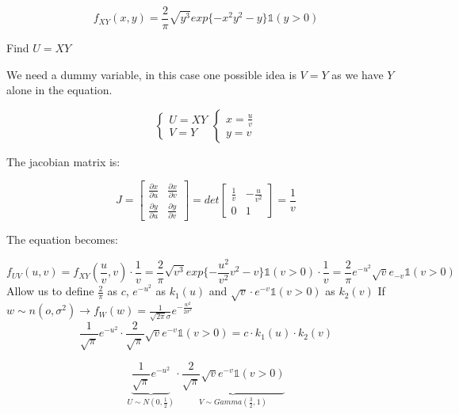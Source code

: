\[
f_{XY} (x,y) = \frac{2}{\pi} \sqrt{y^3} exp\{ -x^2y^2 -y\} \mathbb{1}(y>0)
\]

Find \(U=XY\)


We need a dummy variable, in this case one possible idea is \(V=Y\) as we have \(Y\) alone in the equation.

\[
\begin{cases}
    U = XY \\
    V = Y
\end{cases} \begin{cases}
    x = \frac{u}{v} \\
    y = v
\end{cases}
\]

The jacobian matrix is:

\[
J = \begin{bmatrix}
\frac{{\partial x}}{{\partial u}} & \frac{{\partial x}}{{\partial v}} \\
\frac{{\partial y}}{{\partial u}} & \frac{{\partial y}}{{\partial v}}
\end{bmatrix} =d et \begin{bmatrix}
\frac{1}{v} & -\frac{u}{v^2} \\
0 & 1
\end{bmatrix} = \frac{1}{v}
\]

The equation becomes:

\[
f_{UV} (u,v) = f_{XY} (\frac{u}{v}, v) \cdot \frac{1}{v} = \frac{2}{\pi} \sqrt{v^3} exp\{ -\frac{u^2}{v^2}v^2 -v\} \mathbb{1}(v>0) \cdot \frac{1}{v} = \frac{2}{\pi} e^{-u^2} \sqrt{v} e_{-v} \mathbb{1}(v>0)
\]
Allow us to define \(\frac{2}{\pi}\) as \(c\), \(e^{-u^2}\) as \(k_1(u)\) and \(\sqrt{v} \cdot  e^{-v} \mathbb{1}(v>0)\) as \(k_2(v)\)
If \(w \sim n(o, \sigma^2) \rightarrow f_W(w) = \frac{1}{\sqrt{2\pi} \sigma} e^{-\frac{w^2}{2\sigma^2}}\)
\[
\frac{1}{\sqrt{\pi}} e^{-u^2} \cdot \frac{2}{\sqrt{\pi}} \sqrt{v} e^{-v} \mathbb{1}(v>0) = c \cdot k_1(u) \cdot k_2(v)
\]


\[
\underbrace{\frac{1}{\sqrt{ \pi }} e^{-u^2}}_{U \sim N (0, \frac{1}{2})} \cdot \underbrace{\frac{2}{\sqrt{\pi}} \sqrt{v} e^{-v} \mathbb{1}(v>0)}_{V \sim Gamma (\frac{3}{2}, 1)}
\]

